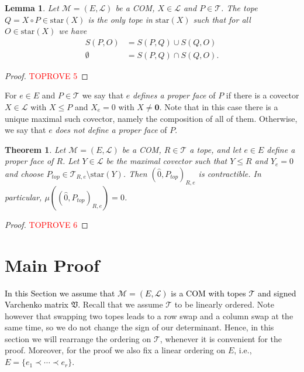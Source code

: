 \documentclass[12pt]{amsart}
\def\Var{{\mathfrak V}}
\def\Tscr{{\mathcal T}}
\def\M{{\mathcal M}}
\def\cstar{{\mathrm{star}}}
\theoremstyle{plain}
\newtheorem{Lemma}{Lemma}
\numberwithin{Lemma}{\DefaultNumberTheoremWithin}
\numberwithin{Claim}{\DefaultNumberTheoremWithin}
\newtheorem{Theorem}{Theorem}
\numberwithin{Theorem}{\DefaultNumberTheoremWithin}
\numberwithin{Corollary}{\DefaultNumberTheoremWithin}
\numberwithin{Proposition}{\DefaultNumberTheoremWithin}
\numberwithin{Conjecture}{\DefaultNumberTheoremWithin}
\numberwithin{Situation}{\DefaultNumberTheoremWithin}
\numberwithin{Note}{\DefaultNumberTheoremWithin}
\theoremstyle{definition}
\numberwithin{Definition}{\DefaultNumberTheoremWithin}
\theoremstyle{definition}
\numberwithin{Question}{\DefaultNumberTheoremWithin}
\theoremstyle{definition}
\numberwithin{Problem}{\DefaultNumberTheoremWithin}
\theoremstyle{remark} \newtheorem{Remark}{Remark}
\numberwithin{Remark}{\DefaultNumberTheoremWithin}
\theoremstyle{remark}
\numberwithin{Example}{\DefaultNumberTheoremWithin}
\numberwithin{Case}{Lemma}
\numberwithin{Step}{Lemma}
\newcommand{\new}[1]{\textcolor{black}{#1}}
\begin{document}
\begin{Lemma}\label{gateCOM} Let $\M=(E,\mathcal{L})$ be a COM, $X \in \mathcal{L}$ and $P \in \Tscr$. The tope $Q = X \circ P \in \cstar(X)$ is the only tope in $\cstar(X)$ such that for all $O \in \cstar(X)$ we have
  \begin{align}
   S(P,O) & =  S(P,Q) \cup S(Q,O) \label{eq:h1} \\  
    \emptyset & =   S(P,Q) \cap S(Q,O). \label{eq:h2}
  \end{align}
\end{Lemma}
\begin{proof}\textcolor{red}{TOPROVE 5}\end{proof}

For $e \in E$ and $P \in \Tscr$ we say that $e$ \emph{defines a proper face} of $P$
if there is a covector $X \in \mathcal{L}$ with $X \leq P$ and $X_e =
0$ with $X\neq \mathbf{0}$. Note that in this case there is a unique maximal such covector, namely the composition of all of them. Otherwise, we say that $e$ \emph{does not define a proper face} of $P$.


\begin{Theorem}
  \label{thm:moebius}
  Let $\M=(E,\mathcal{L})$ be a COM, $R \in \Tscr$ a tope, and let $e \in E$ define a proper face of $R$. 
  Let $Y \in \mathcal{L}$ 
  be the maximal covector such that $Y \leq R$ and $Y_e = 0$
  and choose 
  $P_{top} \in \Tscr_{R,e} \setminus \cstar(Y)$. Then
  $(\hat{0},P_{top})_{R,e}$ is contractible. 
  In particular, $\mu((\hat{0},P_{top})_{R,e}) = 0$.
\end{Theorem}

\begin{proof}\textcolor{red}{TOPROVE 6}\end{proof}

\section{Main Proof}\label{sec:4}
\new{In this Section we assume that $\M=(E,\mathcal{L})$ is a COM with topes $\Tscr$ and signed Varchenko matrix $\Var$.} Recall that we assume $\Tscr$ to be linearly ordered. Note however that swapping two topes leads to a row swap and a column swap at the same time, so we do not change the sign of our determinant. Hence, in this section we will rearrange the ordering on $\Tscr$, whenever it is convenient for the proof. Moreover, for the proof we also fix a linear ordering on $E$, i.e., $E = \{ e_1 \prec \cdots \prec e_r\}$.
\end{document}
